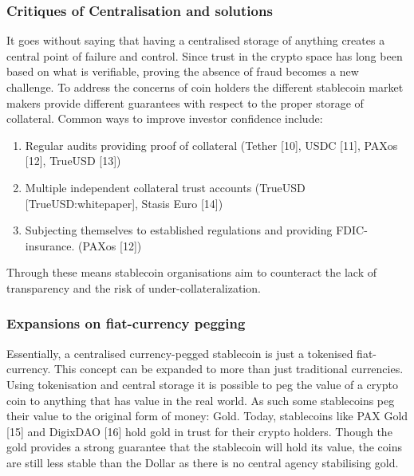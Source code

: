 \documentclass[english,]{IEEEtran}
\providecommand{\tightlist}{%
  \setlength{\itemsep}{0pt}\setlength{\parskip}{0pt}}
\begin{document}
\hypertarget{critiques-of-centralisation-and-solutions}{%
\subsubsection{Critiques of Centralisation and
solutions}\label{critiques-of-centralisation-and-solutions}}

It goes without saying that having a centralised storage of anything
creates a central point of failure and control. Since trust in the
crypto space has long been based on what is verifiable, proving the
absence of fraud becomes a new challenge. To address the concerns of
coin holders the different stablecoin market makers provide different
guarantees with respect to the proper storage of collateral. Common ways
to improve investor confidence include:

\begin{enumerate}
\def\labelenumi{\arabic{enumi}.}
\tightlist
\item
  Regular audits providing proof of collateral (Tether {[}10{]}, USDC
  {[}11{]}, PAXos {[}12{]}, TrueUSD {[}13{]})
\item
  Multiple independent collateral trust accounts (TrueUSD
  {[}TrueUSD:whitepaper{]}, Stasis Euro {[}14{]})
\item
  Subjecting themselves to established regulations and providing FDIC-
  insurance. (PAXos {[}12{]})
\end{enumerate}

Through these means stablecoin organisations aim to counteract the lack
of transparency and the risk of under-collateralization.

\hypertarget{expansions-on-fiat-currency-pegging}{%
\subsubsection{Expansions on fiat-currency
pegging}\label{expansions-on-fiat-currency-pegging}}

Essentially, a centralised currency-pegged stablecoin is just a
tokenised fiat-currency. This concept can be expanded to more than just
traditional currencies. Using tokenisation and central storage it is
possible to peg the value of a crypto coin to anything that has value in
the real world. As such some stablecoins peg their value to the original
form of money: Gold. Today, stablecoins like PAX Gold {[}15{]} and
DigixDAO {[}16{]} hold gold in trust for their crypto holders. Though
the gold provides a strong guarantee that the stablecoin will hold its
value, the coins are still less stable than the Dollar as there is no
central agency stabilising gold.
\end{document}
